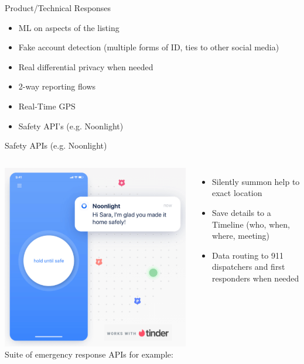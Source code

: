 \documentclass[nobackground,dvipsnames,table,aspectratio=169]{beamer}
\begin{document}
\begin{frame}{Product/Technical Responses}
    \large
    \begin{itemize}
        \item ML on aspects of the listing 
        \item Fake account detection (multiple forms of ID, ties to other social media)
        \item Real differential privacy when needed
        \item 2-way reporting flows
        \item Real-Time GPS
        \item Safety API’s (e.g. Noonlight)
    \end{itemize}
\end{frame}

\begin{frame}{Safety APIs (e.g. Noonlight)}
    \begin{columns}
            \includegraphics[width=\textwidth]{noonlight}
            Suite of emergency response APIs for example:
            \begin{itemize}
                \item Silently summon help to exact location
                \item Save details to a Timeline (who, when, where, meeting)
                \item Data routing to 911 dispatchers and first responders when needed
            \end{itemize}
    \end{columns}
\end{frame}
\end{document}
